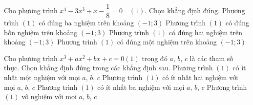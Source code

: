 \begin{ex}%
Cho phương trình $x^4-3x^3+x-\dfrac{1}{8}=0\quad(1)$. Chọn khẳng định đúng.
\choice
{Phương trình $(1)$ có đúng ba nghiệm trên khoảng $(-1;3)$}
{\True Phương trình $(1)$ có đúng bốn nghiệm trên khoảng $(-1;3)$}
{Phương trình $(1)$ có đúng hai nghiệm trên khoảng $(-1;3)$}
{Phương trình $(1)$ có đúng một nghiệm trên khoảng $(-1;3)$}
\end{ex}
\begin{ex}%
Cho phương trình $x^3+ax^2+bx+c=0$\qquad $(1)$ trong đó $a$, $b$, $c$ là các tham số thực. Chọn khẳng định đúng trong các khẳng định sau.
\choice
{\True Phương trình $(1)$ có ít nhất một nghiệm với mọi $a$, $b$, $c$}
{Phương trình $(1)$ có ít nhất hai nghiệm với mọi $a$, $b$, $c$}
{Phương trình $(1)$ có ít nhất ba nghiệm với mọi $a$, $b$, $c$}
{Phương trình $(1)$ vô nghiệm với mọi $a$, $b$, $c$}
\end{ex}

